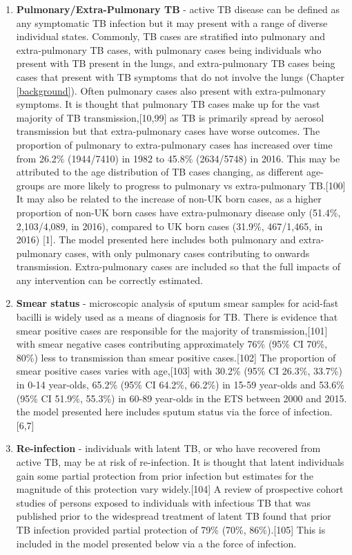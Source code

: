 \documentclass[11pt,twoside]{bristolthesis}
\begin{document}
  \begin{enumerate}
  \def\labelenumi{\arabic{enumi}.}
  \item
    \textbf{Pulmonary/Extra-Pulmonary TB} - active TB disease can be defined as any symptomatic TB infection but it may present with a range of diverse individual states. Commonly, TB cases are stratified into pulmonary and extra-pulmonary TB cases, with pulmonary cases being individuals who present with TB present in the lungs, and extra-pulmonary TB cases being cases that present with TB symptoms that do not involve the lungs (Chapter \ref{background}). Often pulmonary cases also present with extra-pulmonary symptoms. It is thought that pulmonary TB cases make up for the vast majority of TB transmission,{[}10,99{]} as TB is primarily spread by aerosol transmission but that extra-pulmonary cases have worse outcomes. The proportion of pulmonary to extra-pulmonary cases has increased over time from 26.2\% (1944/7410) in 1982 to 45.8\% (2634/5748) in 2016. This may be attributed to the age distribution of TB cases changing, as different age-groups are more likely to progress to pulmonary vs extra-pulmonary TB.{[}100{]} It may also be related to the increase of non-UK born cases, as a higher proportion of non-UK born cases have extra-pulmonary disease only (51.4\%, 2,103/4,089, in 2016), compared to UK born cases (31.9\%, 467/1,465, in 2016) {[}1{]}. The model presented here includes both pulmonary and extra-pulmonary cases, with only pulmonary cases contributing to onwards transmission. Extra-pulmonary cases are included so that the full impacts of any intervention can be correctly estimated.
  \item
    \textbf{Smear status} - microscopic analysis of sputum smear samples for acid-fast bacilli is widely used as a means of diagnosis for TB. There is evidence that smear positive cases are responsible for the majority of transmission,{[}101{]} with smear negative cases contributing approximately 76\% (95\% CI 70\%, 80\%) less to transmission than smear positive cases.{[}102{]} The proportion of smear positive cases varies with age,{[}103{]} with 30.2\% (95\% CI 26.3\%, 33.7\%) in 0-14 year-olds, 65.2\% (95\% CI 64.2\%, 66.2\%) in 15-59 year-olds and 53.6\% (95\% CI 51.9\%, 55.3\%) in 60-89 year-olds in the ETS between 2000 and 2015. the model presented here includes sputum status via the force of infection.{[}6,7{]}
  \item
    \textbf{Re-infection} - individuals with latent TB, or who have recovered from active TB, may be at risk of re-infection. It is thought that latent individuals gain some partial protection from prior infection but estimates for the magnitude of this protection vary widely.{[}104{]} A review of prospective cohort studies of persons exposed to individuals with infectious TB that was published prior to the widespread treatment of latent TB found that prior TB infection provided partial protection of 79\% (70\%, 86\%).{[}105{]} This is included in the model presented below via a the force of infection.

\end{enumerate}
\end{document}
